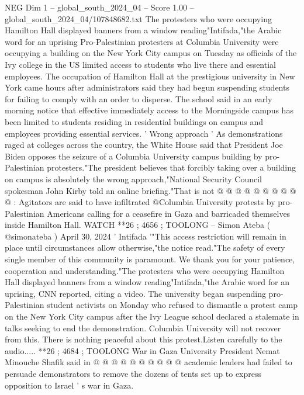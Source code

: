 \begin{textsample}{NEG Dim 1 – global\_south\_2024\_04 – Score 1.00 – global\_south\_2024\_04/107848682.txt}  \label{ex:f1_neg_408}
The protesters who were occupying Hamilton Hall displayed banners from a window reading"Intifada,"the Arabic word for an uprising Pro-Palestinian protesters at Columbia University were occupying a building on the New York City campus on Tuesday as officials of the Ivy college in the US limited access to students who live there and essential employees.
The occupation of Hamilton Hall at the prestigious university in New York came hours after administrators said they had begun suspending students for failing to comply with an order to disperse.
The school said in an early morning notice that effective immediately access to the Morningside campus has been limited to students residing in residential buildings on campus and employees providing essential services. ' Wrong approach ' As demonstrations raged at colleges across the country, the White House said that President Joe Biden opposes the seizure of a Columbia University campus building by pro-Palestinian protesters."The president believes that forcibly taking over a building on campus is absolutely the wrong approach,"National Security Council spokesman John Kirby told an online briefing."That is not @ @ @ @ @ @ @ @ @ @ : Agitators are said to have infiltrated @Columbia University protests by pro-Palestinian Americans calling for a ceasefire in Gaza and barricaded themselves inside Hamilton Hall.
WATCH **26 ; 4656 ; TOOLONG -- Simon Ateba ( @simonateba ) April 30, 2024 ' Intifada '"This access restriction will remain in place until circumstances allow otherwise,"the notice read."The safety of every single member of this community is paramount.
We thank you for your patience, cooperation and understanding."The protesters who were occupying Hamilton Hall displayed banners from a window reading"Intifada,"the Arabic word for an uprising, CNN reported, citing a video.
The university began suspending pro-Palestinian student activists on Monday who refused to dismantle a protest camp on the New York City campus after the Ivy League school declared a stalemate in talks seeking to end the demonstration.
Columbia University will not recover from this.
There is nothing peaceful about this protest.Listen carefully to the audio..... **26 ; 4684 ; TOOLONG War in Gaza University President Nemat Minouche Shafik said in @ @ @ @ @ @ @ @ @ @ academic leaders had failed to persuade demonstrators to remove the dozens of tents set up to express opposition to Israel ' s war in Gaza.

\end{textsample}
